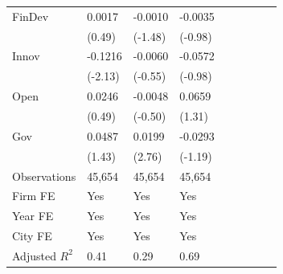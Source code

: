 \begin{table}[htbp]
\begin{tabularx}{\textwidth}{lYYYYYYYY@{}}
FinDev          &   0.0017         &  -0.0010         &  -0.0035         \\
                &   (0.49)         &  (-1.48)         &  (-0.98)         \\
Innov           &  -0.1216\sym{**} &  -0.0060         &  -0.0572         \\
                &  (-2.13)         &  (-0.55)         &  (-0.98)         \\
Open            &   0.0246         &  -0.0048         &   0.0659         \\
                &   (0.49)         &  (-0.50)         &   (1.31)         \\
Gov             &   0.0487         &   0.0199\sym{***}&  -0.0293         \\
                &   (1.43)         &   (2.76)         &  (-1.19)         \\
\hline
Observations    &   45,654         &   45,654         &   45,654         \\
Firm FE         &      Yes         &      Yes         &      Yes         \\
Year FE         &      Yes         &      Yes         &      Yes         \\
City FE         &      Yes         &      Yes         &      Yes         \\
Adjusted $ R^2$ &     0.41         &     0.29         &     0.69         \\
\bottomrule
\end{tabularx}
\end{table}
